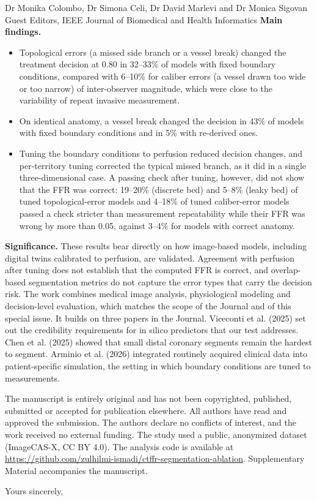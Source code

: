 \documentclass[10pt]{letter}
\begin{document}
\begin{letter}{Dr Monika Colombo, Dr Simona Celi, Dr David Marlevi and Dr Monica Sigovan\\Guest Editors, IEEE Journal of Biomedical and Health Informatics}
\textbf{Main findings.}
\begin{itemize}
\item Topological errors (a missed side branch or a vessel break) changed the treatment decision at 0.80 in 32--33\%
of models with fixed boundary conditions, compared with 6--10\% for caliber errors (a vessel drawn too wide or too narrow) of inter-observer magnitude, which
were close to the variability of repeat invasive measurement.
\item On identical anatomy, a vessel break changed the decision in 43\% of models with fixed boundary conditions and
in 5\% with re-derived ones.
\item Tuning the boundary conditions to perfusion reduced decision changes, and per-territory tuning corrected the
typical missed branch, as it did in a single three-dimensional case. A passing check after tuning, however, did not
show that the FFR was correct: 19--20\% (discrete bed) and 5--8\% (leaky bed) of tuned topological-error models and 4--18\% of tuned caliber-error models passed
a check stricter than measurement repeatability while their FFR was wrong by more than 0.05, against 3--4\% for
models with correct anatomy.
\end{itemize}

\textbf{Significance.} These results bear directly on how image-based models, including digital twins calibrated to
perfusion, are validated. Agreement with
perfusion after tuning does not establish that the computed FFR is correct, and overlap-based segmentation metrics do not capture the error types that
carry the decision risk. The work combines medical image analysis, physiological modeling and decision-level
evaluation, which matches the scope of the Journal and of this special issue. It builds on three papers in the
Journal. Viceconti et al. (2025) set out the credibility requirements for in silico predictors that our test
addresses. Chen et al. (2025) showed that small distal coronary segments remain the hardest to segment. Arminio et al.
(2026) integrated routinely acquired clinical data into patient-specific simulation, the setting in which boundary
conditions are tuned to measurements.

The manuscript is entirely original and has not been copyrighted, published, submitted or accepted for publication
elsewhere. All authors have read
and approved the submission. The authors declare no conflicts of interest, and the work received no external funding.
The study used a public, anonymized dataset (ImageCAS-X, CC BY 4.0). The analysis code is available at \url{https://github.com/zulhilmi-ismadi/ctffr-segmentation-ablation}. Supplementary Material accompanies the manuscript.

\closing{Yours sincerely,}
\end{letter}
\end{document}
